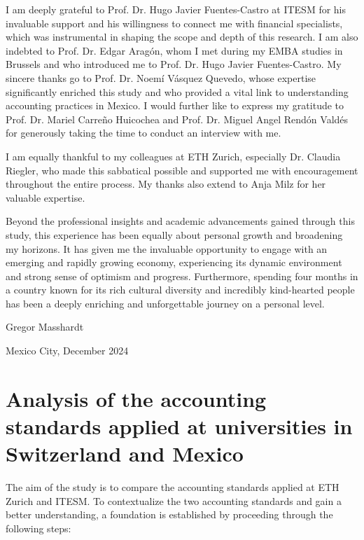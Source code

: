\documentclass[10pt]{article}
\begin{document}
I am deeply grateful to Prof. Dr. Hugo Javier Fuentes-Castro at ITESM for his invaluable support and his willingness to connect me with financial specialists, which was instrumental in shaping the scope and depth of this research. I am also indebted to Prof. Dr. Edgar Aragón, whom I met during my EMBA studies in Brussels and who introduced me to Prof. Dr. Hugo Javier Fuentes-Castro. My sincere thanks go to Prof. Dr. Noemí Vásquez Quevedo, whose expertise significantly enriched this study and who provided a vital link to understanding accounting practices in Mexico. I would further like to express my gratitude to Prof. Dr. Mariel Carreño Huicochea and Prof. Dr. Miguel Angel Rendón Valdés for generously taking the time to conduct an interview with me.

I am equally thankful to my colleagues at ETH Zurich, especially Dr. Claudia Riegler, who made this sabbatical possible and supported me with encouragement throughout the entire process. My thanks also extend to Anja Milz for her valuable expertise.

Beyond the professional insights and academic advancements gained through this study, this experience has been equally about personal growth and broadening my horizons. It has given me the invaluable opportunity to engage with an emerging and rapidly growing economy, experiencing its dynamic environment and strong sense of optimism and progress. Furthermore, spending four months in a country known for its rich cultural diversity and incredibly kind-hearted people has been a deeply enriching and unforgettable journey on a personal level. 

Gregor Masshardt

Mexico City, December 2024

\newpage
\tableofcontents
\newpage
\section{Analysis of the accounting standards applied at universities in Switzerland and Mexico}\label{sec:analysis_of_the_accounting_standards_applied_at_universities_in_switzerland_and_mexico}
The aim of the study is to compare the accounting standards applied at ETH Zurich and ITESM. To contextualize the two accounting standards and gain a better understanding, a foundation is established by proceeding through the following steps:
\end{document}
